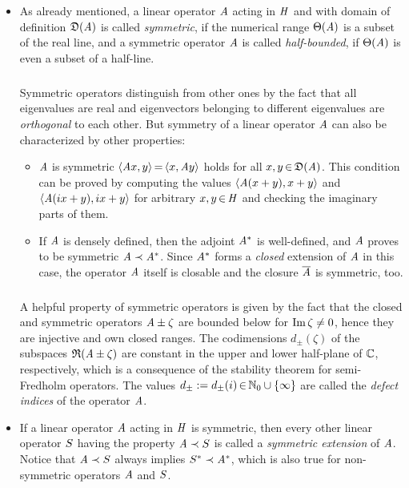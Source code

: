\documentclass[11pt,twoside]{article}
\begin{document}
\begin{itemize}[leftmargin=4mm,itemsep=5pt]
\item[3.] %
As already mentioned,
a linear operator $\mathit{A}$ acting in $\mathit{H}$
and with domain of definition $\mathfrak{D}(\mathit{A})$ is called \textit{symmetric},
if the numerical range $\Theta(\mathit{A})$ is a subset of the real line,
and a symmetric operator $\mathit{A}$ is called \textit{half-bounded},
if $\Theta(\mathit{A})$ is even a subset of a half-line.

\subparagraph{}
Symmetric operators distinguish from other ones by the fact
that all eigen\-values are real and
eigenvectors belonging to different eigen\-values
are \textit{orthogonal} to each other.
But symmetry of a linear operator $\mathit{A}$ can also be characterized
by other properties:

\begin{itemize}[leftmargin=9mm]
\item[(a)]
$\mathit{A}$ is symmetric \iff
$\langle \mathit{A} x,y \rangle {\,=\,} \langle x,\mathit{A} y \rangle$
holds for all $x,y {\,\in\,} \mathfrak{D}(\mathit{A})$.
This condition can be proved by computing the values
$\langle \mathit{A} (x+y),x+y \rangle$ and $\langle \mathit{A} (ix+y),ix+y \rangle$
for arbitrary $x,y {\,\in\,} \mathit{H}$ and checking the imaginary parts of them.
\item[(b)]
If $\mathit{A}$ is densely defined,
then the adjoint $\mathit{A}^*$ is well-defined,
and $\mathit{A}$ proves to be symmetric \iff $\mathit{A} \prec \mathit{A}^*$.
Since $\mathit{A}^*$ forms a \textit{closed} extension of $\mathit{A}$ in this case,
the operator $\mathit{A}$ itself is closable
and the closure $\overline{\mathit{A}}$ is symmetric,
too.
\end{itemize}

\subparagraph{} %
A helpful property of symmetric operators is given by the fact
that the closed and symmetric operators $\mathit{A} \pm \zeta$ are bounded below
for $\operatorname{Im} \zeta \neq 0$,
hence they are injective and own closed ranges.
The codimensions $d_{\pm}(\zeta)$ of the subspaces $\mathfrak{R}(\mathit{A} \pm \zeta)$
are constant in the upper and lower half-plane of ${\mathbb{C}}$,
respectively,
which is a consequence of the stability theorem for semi-Fredholm operators.
The values $d_{\pm} := d_{\pm}(i) {\,\in\,} {\mathbb{N}}_0 \cup \{\infty\}$
are called the \textit{defect indices} of the operator $\mathit{A}$.

\item[4.] %
If a linear operator $\mathit{A}$ acting in $\mathit{H}$ is symmetric,
then every other linear operator ${S}$ having the property
$\mathit{A} \prec {S}$ is called a \textit{symmetric extension} of $\mathit{A}$.
Notice 
that $\mathit{A} \prec {S}$ always implies ${S}^* \prec \mathit{A}^*$,
which is also true for non-symmetric operators $\mathit{A}$ and ${S}$.


\end{itemize}
\end{document}
